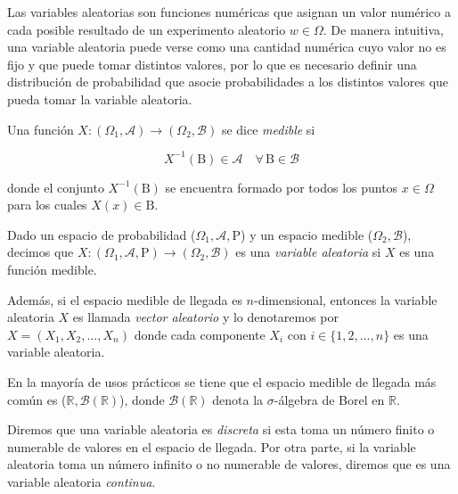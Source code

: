 Las variables aleatorias son funciones numéricas que asignan un valor numérico a cada posible resultado de un experimento aleatorio $w \in \Omega$. De manera intuitiva, una variable aleatoria puede verse como una cantidad numérica cuyo valor no es fijo y que puede tomar distintos valores, por lo que es necesario definir una distribución de probabilidad que asocie probabilidades a los distintos valores que pueda tomar la variable aleatoria. \newline

\begin{definicion}\label{def:funcion-medible}
    Una función $X: (\Omega_1, \mathcal{A}) \to (\Omega_2, \mathcal{B})$ se dice \emph{medible} si

    \[ X^{-1}(\mathrm{B}) \in \mathcal{A} \quad \forall \, \mathrm{B}  \in \mathcal{B} \]

    donde el conjunto $ X^{-1}(\mathrm{B})$ se encuentra formado por todos los puntos $x \in \Omega$ para los cuales $X(x) \in \mathrm{B}$.\newline
\end{definicion}

\begin{definicion}\label{def:variable-aleatoria}
    Dado un espacio de probabilidad ($\Omega_1, \mathcal{A}, \mathrm{P}$) y un espacio medible ($\Omega_2, \mathcal{B}$), decimos que $X: (\Omega_1, \mathcal{A}, \mathrm{P}) \to (\Omega_2, \mathcal{B})$ es una \emph{variable aleatoria} si $X$ es una función medible.
\end{definicion}

Además, si el espacio medible de llegada es $n$-dimensional, entonces la variable aleatoria $X$ es llamada \textit{vector aleatorio} y lo denotaremos por $X = (X_1, X_2, \ldots, X_n)$ donde cada componente $X_i$ con $i \in \{1, 2, \ldots, n\}$ es una variable aleatoria.\newline

\begin{observacion}
    En la mayoría de usos prácticos se tiene que el espacio medible de llegada más común es ($\mathbb{R}, \mathcal{B}(\mathbb{R})$), donde $\mathcal{B}(\mathbb{R})$ denota la $\sigma$-álgebra de Borel en $\mathbb{R}$.\newline
\end{observacion}

\begin{definicion}
    Diremos que una variable aleatoria es \emph{discreta} si esta toma un número finito o numerable de valores en el espacio de llegada. Por otra parte, si la variable aleatoria toma un número infinito o no numerable de valores, diremos que es una variable aleatoria \emph{continua}.\newline
\end{definicion}

